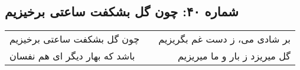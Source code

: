 \begin{center}
\section*{شماره ۴۰: چون گل بشکفت ساعتی برخیزیم}
\label{sec:040}
\begin{longtable}{l p{0.5cm} r}
چون گل بشکفت ساعتی برخیزیم
&&
بر شادی می، ز دست غم بگریزیم
\\
باشد که بهار دیگر ای هم نفسان
&&
گل میریزد ز بار و ما میریزیم
\\
\end{longtable}
\end{center}
